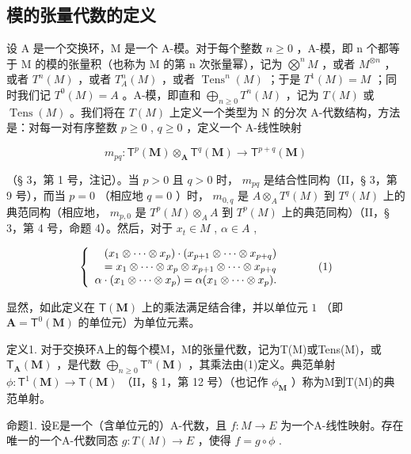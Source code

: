 \subsection{模的张量代数的定义}

设 A 是一个交换环，M 是一个 A-模。对于每个整数 \(n \geqslant 0\) ，A-模，即 n 个都等于 M 的模的张量积（也称为 M 的第 n 次张量幂），记为 \(\bigotimes^{n} M\) ，或者 \(M^{\otimes n}\) ，或者 \(T^{n}(M)\) ，或者 \(T_{A}^{n}(M)\) ，或者 \(\operatorname{Tens}^{n}(M)\) ；于是 \(T^{1}(M) = M\) ；同时我们记 \(T^{0}(M) = A\) 。A-模，即直和 \(\bigoplus_{n \geqslant 0} T^{n}(M)\) ，记为 \(T(M)\) 或 \(\operatorname{Tens}(M)\) 。我们将在 \(T(M)\) 上定义一个类型为 N 的分次 A-代数结构，方法是：对每一对有序整数 \(p \geqslant 0\) , \(q \geqslant 0\) ，定义一个 A-线性映射

\[
m _ {p q} \colon \mathsf {T} ^ {p} (\mathbf {M}) \otimes_ {\mathbf {A}} \mathsf {T} ^ {q} (\mathbf {M}) \rightarrow \mathsf {T} ^ {p + q} (\mathbf {M})
\]

（§ 3，第 1 号，注记）。当 \(p > 0\) 且 \(q > 0\) 时， \(m_{pq}\) 是结合性同构（II，§ 3，第 9 号），而当 \(p = 0\) （相应地 \(q = 0\) ）时， \(m_{0,q}\) 是 \(A \otimes_A T^q(M)\) 到 \(T^q(M)\) 上的典范同构（相应地， \(m_{p,0}\) 是 \(T^p(M) \otimes_A A\) 到 \(T^p(M)\) 上的典范同构）（II，§ 3，第 4 号，命题 4）。然后，对于 \(x_t \in M\) , \(\alpha \in A\) ,

\[
\left\{ \begin{array}{r l} (x _ {1} \otimes \dots \otimes x _ {p}) \cdot (x _ {p + 1} \otimes \dots \otimes x _ {p + q}) & \\ = x _ {1} \otimes \dots \otimes x _ {p} \otimes x _ {p + 1} \otimes \dots \otimes x _ {p + q} \\ \alpha \cdot (x _ {1} \otimes \dots \otimes x _ {p}) = \alpha (x _ {1} \otimes \dots \otimes x _ {p}). \end{array} \right.\tag{1}
\]

显然，如此定义在 \(\mathsf{T}(\mathbf{M})\) 上的乘法满足结合律，并以单位元 \(1\) （即 \(\mathbf{A} = \mathsf{T}^0 (\mathbf{M})\) 的单位元）为单位元素。

定义1. 对于交换环A上的每个模M，M的张量代数，记为T(M)或Tens(M)，或 \(\mathsf{T}_{\mathbf{A}}(\mathbf{M})\) ，是代数 \(\bigoplus_{n\geqslant 0}\mathsf{T}^n (\mathbf{M})\) ，其乘法由(1)定义。典范单射 \(\phi :\mathsf{T}^{1}(\mathbf{M})\to \mathsf{T}(\mathbf{M})\) （II，§ 1，第 12 号）（也记作 \(\phi_{\mathbf{M}}\) ）称为M到T(M)的典范单射。

命题1. 设E是一个（含单位元的）A-代数，且 \(f:M\to E\) 为一个A-线性映射。存在唯一的一个A-代数同态 \(g:T(M)\to E\) ，使得 \(f=g\circ\phi\) .

